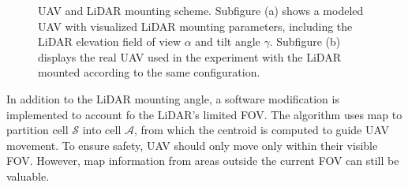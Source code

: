             \begin{figure}[htbp]
                \centering
                \caption{
                    UAV and \ac{LiDAR} mounting scheme.
                    Subfigure (a) shows a modeled UAV with visualized \ac{LiDAR} mounting parameters, including the \ac{LiDAR} elevation field of view $\alpha$ and tilt angle $\gamma$. 
                    Subfigure (b) displays the real UAV used in the experiment with the \ac{LiDAR} mounted according to the same configuration.                                                
                }
                \label{fig:uavs}
            \end{figure}


            In addition to the \ac{LiDAR} mounting angle, a software modification is implemented to account fo the \ac{LiDAR}'s limited \ac{FOV}.
            The algorithm uses map to partition cell $\mathcal{S}$ into cell $\mathcal{A}$, from which the centroid is computed to guide \ac{UAV} movement.
            To ensure safety, \ac{UAV} should only move only within their visible \ac{FOV}. 
            However, map information from areas outside the current \ac{FOV} can still be valuable. 


